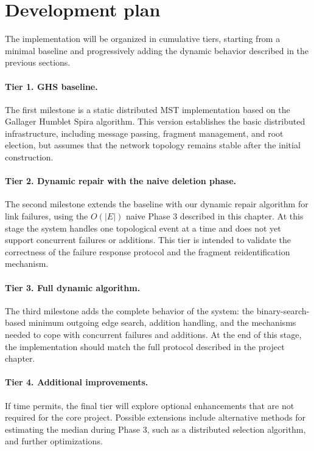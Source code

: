 \section{Development plan}

The implementation will be organized in cumulative tiers, starting from a minimal
baseline and progressively adding the dynamic behavior described in the previous
sections. 

\paragraph{Tier 1. GHS baseline.}
The first milestone is a static distributed MST implementation based on the
Gallager Humblet Spira algorithm. This version establishes the basic distributed
infrastructure, including message passing, fragment management, and root election, but
assumes that the network topology remains stable after the initial construction.

\paragraph{Tier 2. Dynamic repair with the naive deletion phase.}
The second milestone extends the baseline with our dynamic repair algorithm for
link failures, using the $O(|E|)$ naive Phase 3 described in this chapter. At this stage
the system handles one topological event at a time and does not yet support concurrent
failures or additions. This tier is intended to validate the correctness of the failure
response protocol and the fragment reidentification mechanism.

\paragraph{Tier 3. Full dynamic algorithm.}
The third milestone adds the complete behavior of the system: the binary-search-based
minimum outgoing edge search, addition handling, and the mechanisms needed to cope with
concurrent failures and additions. At the end of this stage, the implementation should
match the full protocol described in the project chapter.

\paragraph{Tier 4. Additional improvements.}
If time permits, the final tier will explore optional enhancements that are not required
for the core project. Possible extensions include alternative methods for estimating the
median during Phase 3, such as a distributed selection algorithm, and further
optimizations.